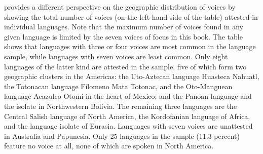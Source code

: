  provides a different perspective on the geographic distribution of voices by showing the total number of voices (on the left-hand side of the table) attested in individual languages. Note that the maximum number of voices found in any given language is limited by the seven voices of focus in this book. The table shows that languages with three or four voices are most common in the language sample, while languages with seven voices are least common. Only eight languages of the latter kind are attested in the sample, five of which form two geographic clusters in the Americas: the Uto-Aztecan language Huasteca Nahuatl, the Totonacan language Filomeno Mata Totonac, and the Oto-Manguean language Acazulco Otomí in the heart of Mexico; and the Panoan language  and the isolate  in Northwestern Bolivia. The remaining three languages are the Central Salish language  of North America, the Kordofanian language  of Africa, and the language isolate  of Eurasia. Languages with seven voices are unattested in Australia and Papunesia. Only 25 languages in the sample (11.3 percent) feature no voice at all, none of which are spoken in North America. 

